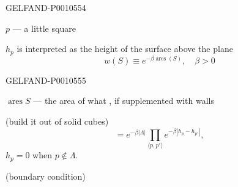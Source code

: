 \begin{GelfandAdjacentEvidence}{GELFAND-P001055}{4}

$p$ — a little square

$h_p$ is interpreted as the height of the surface above the plane
\begin{equation*}
w(S)\equiv e^{-\beta\operatorname{ares}(S)},\quad\beta>0
\tag{2}
\end{equation*}
\end{GelfandAdjacentEvidence}
\begin{GelfandAdjacentEvidence}{GELFAND-P001055}{5}

$\operatorname{ares} S$ — the area of what , if supplemented with
 walls
\end{GelfandAdjacentEvidence}


(build it out of solid cubes)
\begin{equation*}
=e^{-\beta|\Lambda|}\prod_{\langle p,p'\rangle}e^{-\beta|h_p-h_{p'}|},
\tag{3}
\end{equation*}
$h_p=0$ when $p\notin\Lambda$.

(boundary condition)


